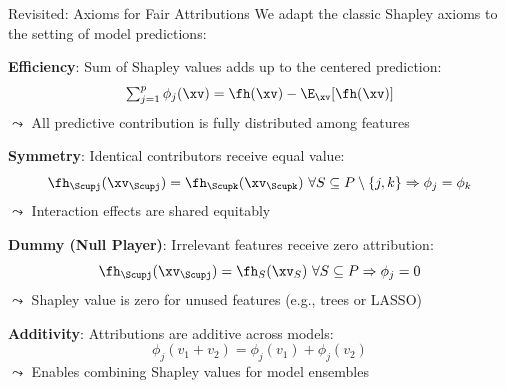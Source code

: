 \documentclass[10pt,compress,t,notes=noshow, xcolor=table]{beamer}
\begin{document}
\begin{framev}[align=top]{Revisited: Axioms for Fair Attributions}
We adapt the classic Shapley axioms to the setting of model predictions:
\\
\spacer[0.25]
\begin{itemizeM}%
\item \textbf{Efficiency}: Sum of Shapley values adds up to the centered prediction:
$$
\textstyle\sum_{j=1}^p \phi_j(\xv) = \fh(\xv) - \E_{\xv}[\fh(\xv)]
$$
$\leadsto$ All predictive contribution is fully distributed among features
\item \textbf{Symmetry}: Identical contributors receive equal value:
$$
\fh_{\Scupj}(\xv_{\Scupj}) = \fh_{\Scupk}(\xv_{\Scupk}) \ \forall S \subseteq P \setminus \{j,k\}
\Rightarrow \phi_j = \phi_k
$$
$\leadsto$ Interaction effects are shared equitably
\item \textbf{Dummy (Null Player)}: Irrelevant features receive zero attribution:
$$
\fh_{\Scupj}(\xv_{\Scupj}) = \fh_S(\xv_S) \ \forall S \subseteq P \Rightarrow \phi_j = 0
$$
$\leadsto$ Shapley value is zero for unused features (e.g., trees or LASSO)
\item \textbf{Additivity}: Attributions are additive across models:
$$
\phi_j(v_1 + v_2) = \phi_j(v_1) + \phi_j(v_2)
$$
$\leadsto$ Enables combining Shapley values for model ensembles
\end{itemizeM}
\end{framev}





\end{document}
